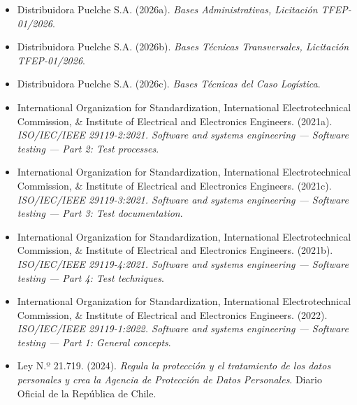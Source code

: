 \begin{itemize}[before=\raggedright,itemsep=0pt,parsep=0pt,topsep=2pt]
  \item Distribuidora Puelche S.A. (2026a). \emph{Bases Administrativas, Licitación TFEP-01/2026}.
  \item Distribuidora Puelche S.A. (2026b). \emph{Bases Técnicas Transversales, Licitación TFEP-01/2026}.
  \item Distribuidora Puelche S.A. (2026c). \emph{Bases Técnicas del Caso Logística}.
  \item International Organization for Standardization, International Electrotechnical Commission, \& Institute of Electrical and Electronics Engineers. (2021a). \emph{ISO/IEC/IEEE 29119-2:2021. Software and systems engineering — Software testing — Part 2: Test processes}.
  \item International Organization for Standardization, International Electrotechnical Commission, \& Institute of Electrical and Electronics Engineers. (2021c). \emph{ISO/IEC/IEEE 29119-3:2021. Software and systems engineering — Software testing — Part 3: Test documentation}.
  \item International Organization for Standardization, International Electrotechnical Commission, \& Institute of Electrical and Electronics Engineers. (2021b). \emph{ISO/IEC/IEEE 29119-4:2021. Software and systems engineering — Software testing — Part 4: Test techniques}.
  \item International Organization for Standardization, International Electrotechnical Commission, \& Institute of Electrical and Electronics Engineers. (2022). \emph{ISO/IEC/IEEE 29119-1:2022. Software and systems engineering — Software testing — Part 1: General concepts}.
  \item Ley N.º 21.719. (2024). \emph{Regula la protección y el tratamiento de los datos personales y crea la Agencia de Protección de Datos Personales}. Diario Oficial de la República de Chile.
\end{itemize}
